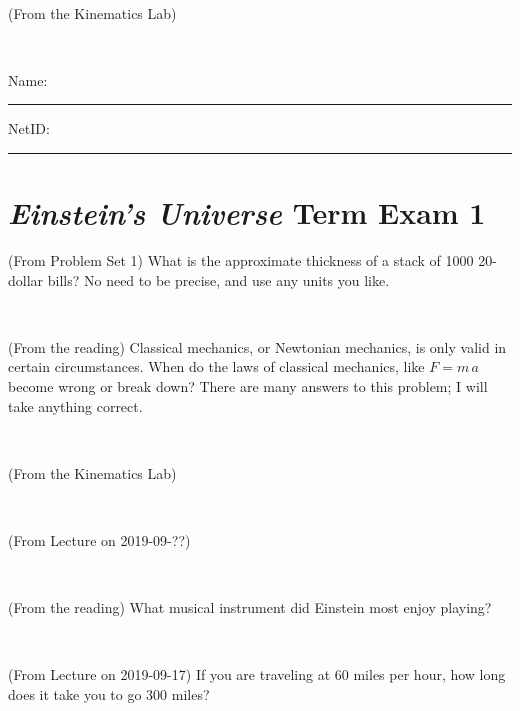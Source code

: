 \documentclass[12pt, letterpaper]{article}
\begin{document}
\vfill ~

\begin{problem} (From the Kinematics Lab)

\end{problem}


\vfill ~


\cleardoublepage



\noindent
Name: \rule[-1ex]{0.60\textwidth}{0.1pt}
NetID: \rule[-1ex]{0.20\textwidth}{0.1pt}

\section*{\textsl{Einstein's Universe} Term Exam 1}
\setcounter{problem}{1}


\begin{problem} (From Problem Set 1)
What is the approximate thickness of a stack of 1000 20-dollar bills?
No need to be precise, and use any units you like.
\end{problem}


\vfill ~

\begin{problem} (From the reading)
Classical mechanics, or Newtonian mechanics, is only valid in certain
circumstances. When do the laws of classical mechanics, like $F =
m\,a$ become wrong or break down? There are many answers to this
problem; I will take anything correct.
\end{problem}


\vfill ~

\begin{problem} (From the Kinematics Lab)

\end{problem}


\vfill ~

\begin{problem} (From Lecture on 2019-09-??)
\end{problem}


\vfill ~


\clearpage


\begin{problem} (From the reading)
What musical instrument did Einstein most enjoy playing?
\end{problem}


\vfill ~

\begin{problem} (From Lecture on 2019-09-17)
If you are traveling at 60 miles per hour, how long does
it take you to go 300 miles?
\end{problem}
\end{document}
